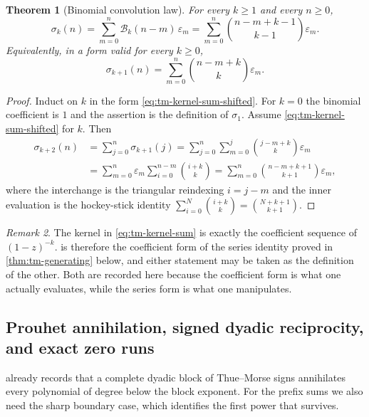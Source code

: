 \documentclass[11pt,oneside]{article}
\newtheorem{theorem}{Theorem}[section]
\theoremstyle{definition}
\theoremstyle{remark}
\newtheorem{remark}[theorem]{Remark}
\begin{document}
\begin{theorem}[Binomial convolution law]
\label{thm:tm-convolution}
For every $k\ge1$ and every $n\ge0$,
\begin{equation}
 \sigma_k(n)=\sum_{m=0}^{n}\mathcal B_k(n-m)\,\varepsilon_m
 =\sum_{m=0}^{n}\binom{n-m+k-1}{k-1}\varepsilon_m.         \label{eq:tm-kernel-sum}
\end{equation}
Equivalently, in a form valid for every $k\ge0$,
\begin{equation}
 \sigma_{k+1}(n)=\sum_{m=0}^{n}\binom{n-m+k}{k}\varepsilon_m. \label{eq:tm-kernel-sum-shifted}
\end{equation}
\end{theorem}

\begin{proof}
Induct on $k$ in the form \eqref{eq:tm-kernel-sum-shifted}.  For $k=0$ the binomial
coefficient is $1$ and the assertion is the definition of $\sigma_1$.  Assume
\eqref{eq:tm-kernel-sum-shifted} for $k$.  Then
\begin{align*}
 \sigma_{k+2}(n)
 &=\sum_{j=0}^{n}\sigma_{k+1}(j)
  =\sum_{j=0}^{n}\sum_{m=0}^{j}\binom{j-m+k}{k}\varepsilon_m\\
 &=\sum_{m=0}^{n}\varepsilon_m\sum_{i=0}^{n-m}\binom{i+k}{k}
  =\sum_{m=0}^{n}\binom{n-m+k+1}{k+1}\varepsilon_m,
\end{align*}
where the interchange is the triangular reindexing $i=j-m$ and the inner evaluation is the
hockey-stick identity $\sum_{i=0}^{N}\binom{i+k}{k}=\binom{N+k+1}{k+1}$.
\end{proof}

\begin{remark}
The kernel in \eqref{eq:tm-kernel-sum} is exactly the coefficient sequence of
$(1-z)^{-k}$.   is therefore the coefficient form of the series
identity proved in \cref{thm:tm-generating} below, and either statement may be taken as the
definition of the other.  Both are recorded here because the coefficient form is what one
actually evaluates, while the series form is what one manipulates.
\end{remark}

\subsection{Prouhet annihilation, signed dyadic reciprocity, and exact zero runs}
\label{tm:sub-zero-runs}

 already records that a complete dyadic block of Thue--Morse
signs annihilates every polynomial of degree below the block exponent.  For the prefix sums
we also need the sharp boundary case, which identifies the first power that survives.
\end{document}
